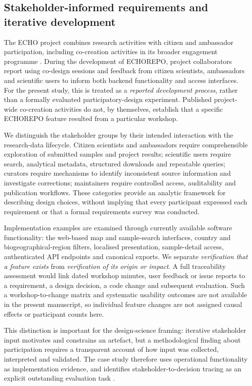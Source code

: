 \documentclass[11pt,a4paper]{article}
\begin{document}
\subsection{Stakeholder-informed requirements and iterative development}
The ECHO project combines research activities with citizen and ambassador participation, including co-creation activities in its broader engagement programme \parencite{echo2024ambassadors}. During the development of ECHOREPO, project collaborators report using co-design sessions and feedback from citizen scientists, ambassadors and scientific users to inform both backend functionality and access interfaces. For the present study, this is treated as a \emph{reported development process}, rather than a formally evaluated participatory-design experiment. Published project-wide co-creation activities do not, by themselves, establish that a specific ECHOREPO feature resulted from a particular workshop.

We distinguish the stakeholder groups by their intended interaction with the research-data lifecycle. Citizen scientists and ambassadors require comprehensible exploration of submitted samples and project results; scientific users require search, analytical metadata, structured downloads and repeatable queries; curators require mechanisms to identify inconsistent source information and investigate corrections; maintainers require controlled access, auditability and publication workflows. These categories provide an analytic framework for describing design choices, without implying that every participant expressed each requirement or that a formal requirements survey was conducted.

Implementation examples are examined through currently available software functionality: the web-based map and sample-search interfaces, country and biogeographical-region filters, localised presentation, sample-detail access, authenticated API endpoints and canonical exports. We separate \emph{verification that a feature exists} from \emph{verification of its origin or impact}. A full traceability assessment would link dated workshop minutes, user feedback or issue reports to a requirement, a design decision, a code change and subsequent evaluation. Such a workshop-to-change matrix and systematic usability outcomes are not available in the present manuscript, so individual feature changes are not assigned causal effects or participant counts here.

This distinction is important for the design-science framing: iterative stakeholder input motivates and constrains an artefact, but a methodological finding about participation requires a transparent account of how input was collected, interpreted and validated. The case study therefore uses operational functionality as implementation evidence, and identifies stakeholder-to-decision tracing as an explicit outstanding evaluation task \parencite{hevner2004design,peffers2007dsrm}.
\end{document}
